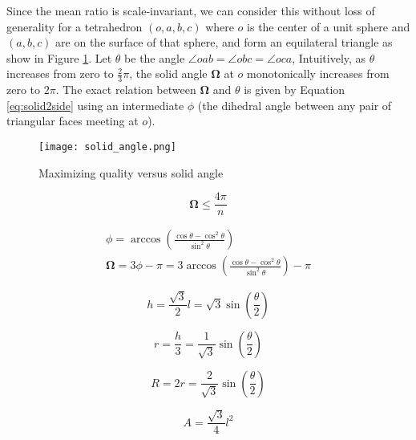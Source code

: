Since the mean ratio is scale-invariant, we can consider this
without loss of generality for a tetrahedron $(o,a,b,c)$ where
$o$ is the center of a unit sphere and $(a,b,c)$ are on the surface
of that sphere, and form an equilateral triangle
as show in Figure \ref{fig:solid_angle}.
Let $\theta$ be the angle $\angle oab = \angle obc = \angle oca$,
Intuitively, as $\theta$ increases from zero to $\frac23\pi$,
the solid angle $\mathbf{\Omega}$ at $o$ monotonically
increases from zero to $2\pi$.
The exact relation between $\mathbf{\Omega}$ and $\theta$ is given by Equation
\ref{eq:solid2side}
using an intermediate $\phi$ (the dihedral angle between any pair of triangular
faces meeting at $o$).

\begin{figure}
\begin{center}
\texttt{[image: solid\_angle.png]}
\caption{Maximizing quality versus solid angle}
\label{fig:solid_angle}
\end{center}
\end{figure}

\begin{equation} \label{eq:solid_angle_degree}
\mathbf{\Omega} \leq \frac{4\pi}{n}
\end{equation}

\begin{gather} \label{eq:solid2side}
\phi = \arccos\left(\frac{\cos\theta - \cos^2\theta}{\sin^2\theta}\right) \\
\mathbf{\Omega} = 3\phi - \pi = 3\arccos\left(\frac{\cos\theta - \cos^2\theta}{\sin^2\theta}\right) - \pi
\end{gather}

\begin{equation} \label{eq:surf_tri_height}
h = \frac{\sqrt{3}}{2}l = \sqrt{3}\sin\left(\frac{\theta}{2}\right)
\end{equation}

\begin{equation} \label{eq:surf_tri_inradius}
r = \frac{h}{3} = \frac{1}{\sqrt{3}}\sin\left(\frac{\theta}{2}\right)
\end{equation}

\begin{equation} \label{eq:surf_tri_circumradius}
R = 2r = \frac{2}{\sqrt{3}} \sin\left(\frac{\theta}{2}\right)
\end{equation}

\begin{equation} \label{eq:surf_tri_area}
A = \frac{\sqrt{3}}{4}l^2
\end{equation}

